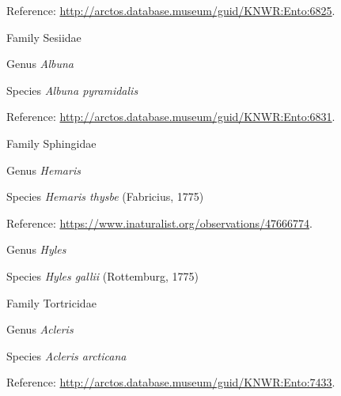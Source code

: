 \documentclass[9pt, article]{memoir}
\begin{document}
\begin{multicols}{2}
\vspace{6pt}Reference: 
\url{http://arctos.database.museum/guid/KNWR:Ento:6825}.

\vspace{6pt}\noindent\hspace{24pt}Family Sesiidae


\vspace{6pt}\noindent\hspace{30pt}Genus \textit{Albuna}


\vspace{6pt}\noindent\hspace{36pt}Species \textit{Albuna pyramidalis}


\vspace{6pt}Reference: 
\url{http://arctos.database.museum/guid/KNWR:Ento:6831}.

\vspace{6pt}\noindent\hspace{24pt}Family Sphingidae


\vspace{6pt}\noindent\hspace{30pt}Genus \textit{Hemaris}


\vspace{6pt}\noindent\hspace{36pt}Species \textit{Hemaris thysbe} (Fabricius, 1775)


\vspace{6pt}Reference: 
\url{https://www.inaturalist.org/observations/47666774}.

\vspace{6pt}\noindent\hspace{30pt}Genus \textit{Hyles}


\vspace{6pt}\noindent\hspace{36pt}Species \textit{Hyles gallii} (Rottemburg, 1775)


\vspace{6pt}\noindent\hspace{24pt}Family Tortricidae


\vspace{6pt}\noindent\hspace{30pt}Genus \textit{Acleris}


\vspace{6pt}\noindent\hspace{36pt}Species \textit{Acleris arcticana}


\vspace{6pt}Reference: 
\url{http://arctos.database.museum/guid/KNWR:Ento:7433}.


\end{multicols}
\end{document}
